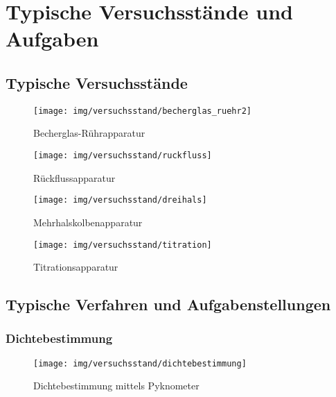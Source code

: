 \section{Typische Versuchsstände und Aufgaben}

\subsection{Typische Versuchsstände}

\begin{figure}[h!]
	\begin{minipage}[b]{.4\textwidth} %
		\centering
		\texttt{[image: img/versuchsstand/becherglas\_ruehr2]}
		\caption{Becherglas-Rührapparatur}
		\label{fig:becherglas_ruehrapparatur}
	\end{minipage}
	\hspace{.1\linewidth}%
	\begin{minipage}[b]{.4\textwidth} %
		\centering
		\texttt{[image: img/versuchsstand/ruckfluss]}
		\caption{Rückflussapparatur}
		\label{fig:ruckfluss}
	\end{minipage}
\end{figure}
\FloatBarrier

\begin{figure}[h!]
	\begin{minipage}[b]{.45\textwidth} %
		\centering
		\texttt{[image: img/versuchsstand/dreihals]}
		\caption{Mehrhalskolbenapparatur}
		\label{fig:mehrhals}
	\end{minipage}
\hspace{.1\linewidth}%
\begin{minipage}[b]{.45\textwidth} %
	\centering
	\texttt{[image: img/versuchsstand/titration]}
	\caption{Titrationsapparatur}
	\label{fig:titration}
\end{minipage}
\end{figure}
\FloatBarrier

\newpage

\subsection{Typische Verfahren und Aufgabenstellungen}
\subsubsection*{Dichtebestimmung}
\begin{figure}[h!]
	\centering
	\texttt{[image: img/versuchsstand/dichtebestimmung]}
	\caption{Dichtebestimmung mittels Pyknometer}
	\label{fig:dichte}
\end{figure}
\FloatBarrier

